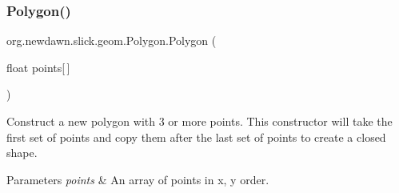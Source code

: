 \subsubsection{\texorpdfstring{Polygon()}{Polygon()}\hspace{0.1cm}{\footnotesize\ttfamily [1/2]}}
{\footnotesize\ttfamily org.\+newdawn.\+slick.\+geom.\+Polygon.\+Polygon (\begin{DoxyParamCaption}\item[{float}]{points\mbox{[}$\,$\mbox{]} }\end{DoxyParamCaption})\hspace{0.3cm}{\ttfamily [inline]}}

Construct a new polygon with 3 or more points. This constructor will take the first set of points and copy them after the last set of points to create a closed shape.


\begin{DoxyParams}{Parameters}
{\em points} & An array of points in x, y order. \\
\hline
\end{DoxyParams}

